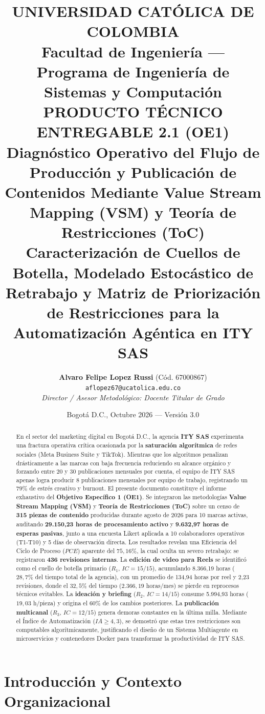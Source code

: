 \documentclass[11pt,a4paper]{article}
\title{
  \vspace{-1.5cm}
  \textbf{UNIVERSIDAD CATÓLICA DE COLOMBIA}\\[0.3em]
  \large Facultad de Ingeniería --- Programa de Ingeniería de Sistemas y Computación\\[1.5em]
  \Large \textbf{PRODUCTO TÉCNICO ENTREGABLE 2.1 (OE1)}\\[0.5em]
  \huge \textbf{Diagnóstico Operativo del Flujo de Producción y Publicación de Contenidos Mediante Value Stream Mapping (VSM) y Teoría de Restricciones (ToC)}\\[0.8em]
  \large Caracterización de Cuellos de Botella, Modelado Estocástico de Retrabajo y Matriz de Priorización de Restricciones para la Automatización Agéntica en ITY SAS
}
\author{\textbf{Alvaro Felipe Lopez Russi} (Cód. 67000867) \\ \texttt{aflopez67@ucatolica.edu.co} \\[0.5em] \textit{Director / Asesor Metodológico: Docente Titular de Grado}}
\date{Bogotá D.C., Octubre 2026 --- Versión 3.0}
\begin{document}
\maketitle

\begin{abstract}
\noindent En el sector del marketing digital en Bogotá D.C., la agencia \textbf{ITY SAS} experimenta una fractura operativa crítica ocasionada por la \textbf{saturación algorítmica} de redes sociales (Meta Business Suite y TikTok). Mientras que los algoritmos penalizan drásticamente a las marcas con baja frecuencia reduciendo su alcance orgánico y forzando entre 20 y 30 publicaciones mensuales por cuenta, el equipo de ITY SAS apenas logra producir 8 publicaciones mensuales por equipo de trabajo, registrando un $79\%$ de estrés creativo y burnout. El presente documento constituye el informe exhaustivo del \textbf{Objetivo Específico 1 (OE1)}. Se integraron las metodologías \textbf{Value Stream Mapping (VSM)} y \textbf{Teoría de Restricciones (ToC)} sobre un censo de \textbf{315 piezas de contenido} producidas durante agosto de 2026 para 10 marcas activas, auditando \textbf{29.150,23 horas de procesamiento activo} y \textbf{9.632,97 horas de esperas pasivas}, junto a una encuesta Likert aplicada a 10 colaboradores operativos (T1-T10) y 5 días de observación directa. Los resultados revelan una Eficiencia del Ciclo de Proceso ($PCE$) aparente del $75,16\%$, la cual oculta un severo retrabajo: se registraron \textbf{436 revisiones internas}. La \textbf{edición de video para Reels} se identificó como el cuello de botella primario ($R_1$, $IC=15/15$), acumulando 8.366,19 horas ($28,7\%$ del tiempo total de la agencia), con un promedio de 134,94 horas por reel y 2,23 revisiones, donde el $32,5\%$ del tiempo ($2.366,19$ horas/mes) se pierde en reprocesos técnicos evitables. La \textbf{ideación y briefing} ($R_2$, $IC=14/15$) consume 5.994,93 horas ($19,03$ h/pieza) y origina el $60\%$ de los cambios posteriores. La \textbf{publicación multicanal} ($R_3$, $IC=12/15$) genera demoras constantes en la última milla. Mediante el Índice de Automatización ($IA \ge 4,3$), se demostró que estas tres restricciones son computables algorítmicamente, justificando el diseño de un Sistema Multiagente en microservicios y contenedores Docker para transformar la productividad de ITY SAS.
\end{abstract}

\tableofcontents
\newpage

\section{Introducción y Contexto Organizacional}\label{sec:intro}
\end{document}
